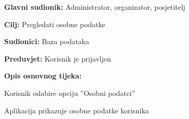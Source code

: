 					\noindent {}
					\begin{packed_item}

						\item \textbf{Glavni sudionik:} Administrator, organizator, posjetitelj
						\item  \textbf{Cilj:} Pregledati osobne podatke
						\item  \textbf{Sudionici:} Baza podataka
						\item  \textbf{Preduvjet:} Korisnik je prijavljen
						\item  \textbf{Opis osnovnog tijeka:}

						\item[] \begin{packed_enum}

							\item Korisnik odabire opciju ”Osobni podatci”
							\item Aplikacija prikazuje osobne podatke korisnika

						\end{packed_enum}

					\end{packed_item}


